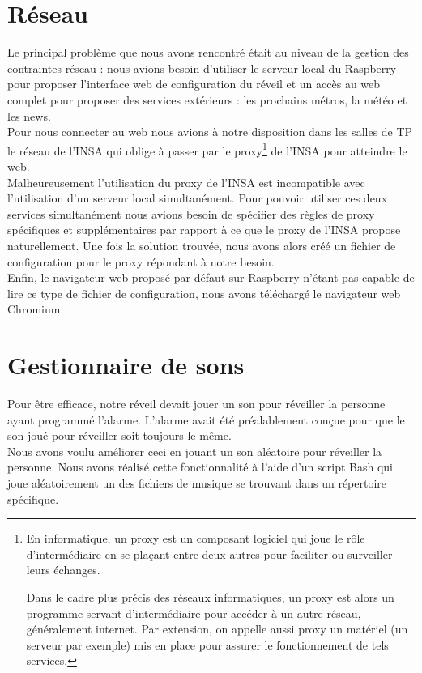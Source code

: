 \section{Réseau}
	Le principal problème que nous avons rencontré était au niveau de la gestion des contraintes réseau : nous avions besoin d'utiliser le serveur local du Raspberry pour proposer l'interface web de configuration du réveil et un accès au web complet pour proposer des services extérieurs : les prochains métros, la météo et les news.\\

	Pour nous connecter au web nous avions à notre disposition dans les salles de TP le réseau de l'INSA qui oblige à passer par le proxy\footnote{En informatique, un proxy est un composant logiciel qui joue le rôle d'intermédiaire en se plaçant entre deux autres pour faciliter ou surveiller leurs échanges.

	Dans le cadre plus précis des réseaux informatiques, un proxy est alors un programme servant d'intermédiaire pour accéder à un autre réseau, généralement internet. Par extension, on appelle aussi proxy un matériel (un serveur par exemple) mis en place pour assurer le fonctionnement de tels services.} de l'INSA pour atteindre le web.\\

	Malheureusement l'utilisation du proxy de l'INSA est incompatible avec l'utilisation d'un serveur local simultanément. Pour pouvoir utiliser ces deux services simultanément nous avions besoin de spécifier des règles de proxy spécifiques et supplémentaires par rapport à ce que le proxy de l'INSA propose naturellement. Une fois la solution trouvée, nous avons alors créé un fichier de configuration pour le proxy répondant à notre besoin.\\

	Enfin, le navigateur web proposé par défaut sur Raspberry n'étant pas capable de lire ce type de fichier de configuration, nous avons téléchargé le navigateur web Chromium.

\section{Gestionnaire de sons}
	Pour être efficace, notre réveil devait jouer un son pour réveiller la personne ayant programmé l'alarme. L'alarme avait été préalablement conçue pour que le son joué pour réveiller soit toujours le même.\\

	Nous avons voulu améliorer ceci en jouant un son aléatoire pour réveiller la personne. Nous avons réalisé cette fonctionnalité à l'aide d'un script Bash qui joue aléatoirement un des fichiers de musique se trouvant dans un répertoire spécifique.